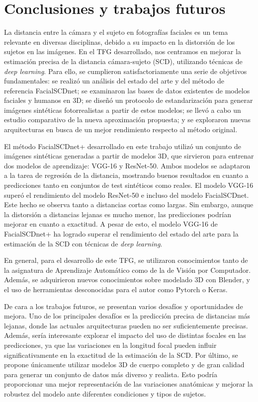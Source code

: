 \chapter{Conclusiones y trabajos futuros}

\thispagestyle{empty}

La distancia entre la cámara y el sujeto en fotografías faciales es un tema relevante en diversas disciplinas, debido a su impacto en la distorsión de los sujetos en las imágenes. En el TFG desarrollado, nos centramos en mejorar la estimación precisa de la distancia cámara-sujeto (SCD), utilizando técnicas de \textit{deep learning}. Para ello, se cumplieron satisfactoriamente una serie de objetivos fundamentales: se realizó un análisis del estado del arte y del método de referencia FacialSCDnet; se examinaron las bases de datos existentes de modelos faciales y humanos en 3D; se diseñó un protocolo de estandarización para generar imágenes sintéticas fotorrealistas a partir de estos modelos; se llevó a cabo un estudio comparativo de la nueva aproximación propuesta; y se exploraron nuevas arquitecturas en busca de un mejor rendimiento respecto al método original.

El método FacialSCDnet+ desarrollado en este trabajo utilizó un conjunto de imágenes sintéticas generadas a partir de modelos 3D, que sirvieron para entrenar dos modelos de aprendizaje: VGG-16 y ResNet-50. Ambos modelos se adaptaron a la tarea de regresión de la distancia, mostrando buenos resultados en cuanto a predicciones tanto en conjuntos de test sintéticos como reales. El modelo VGG-16 superó el rendimiento del modelo ResNet-50 e incluso del modelo FacialSCDnet. Este hecho se observa tanto a distancias cortas como largas. Sin embargo, aunque la distorsión a distancias lejanas es mucho menor, las predicciones podrían mejorar en cuanto a exactitud. A pesar de esto, el modelo VGG-16 de FacialSCDnet+ ha logrado superar el rendimiento del estado del arte para la estimación de la SCD con técnicas de \textit{deep learning}.

En general, para el desarrollo de este TFG, se utilizaron conocimientos tanto de la asignatura de Aprendizaje Automático como de la de Visión por Computador. Además, se adquirieron nuevos conocimientos sobre modelado 3D con Blender, y el uso de herramientas desconocidas para el autor como Pytorch o Keras.

De cara a los trabajos futuros, se presentan varios desafíos y oportunidades de mejora. Uno de los principales desafíos es la predicción precisa de distancias más lejanas, donde las actuales arquitecturas pueden no ser suficientemente precisas. Además, sería interesante explorar el impacto del uso de distintas focales en las predicciones, ya que las variaciones en la longitud focal pueden influir significativamente en la exactitud de la estimación de la SCD. Por último, se propone únicamente utilizar modelos 3D de cuerpo completo y de gran calidad para generar un conjunto de datos más diverso y realista. Esto podría proporcionar una mejor representación de las variaciones anatómicas y mejorar la robustez del modelo ante diferentes condiciones y tipos de sujetos.
